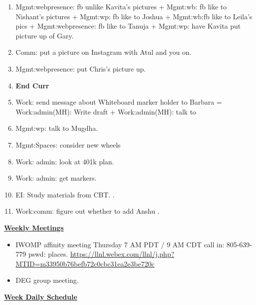 \begin{enumerate}
        \item \small Mgmt:webpresence: fb unlike Kavita’s pictures + Mgmt:wb:
          fb like to Nishant's pictures +  Mgmt:wp: fb like to Joshua
          + Mgmt:wb:fb like to Leila's pics + Mgmt:webpresence: fb
          like to Tanuja + Mgmt:wp: have Kavita put picture up of
          Gary. 

        \item \small Comm: put a picture on Instagram with Atul and you on. 
        \item \small Mgmt:webpresence: put Chris's picture up.

        \item \small \textbf{End Curr} 
        \item \small Work: send message about Whiteboard marker holder to
          Barbara = Work:admin(MH): Write draft +
          Work:admin(MH): talk to 

        \item \small Mgmt:wp: talk to Mugdha. 


        \item \small  Mgmt:Spaces: consider new wheels 
        \item \small Work: admin: look at 401k plan. 
        \item \small Work: admin: get markers.
         
        \item \small EI: Study materials from CBT.   .
        \item \small Work:comm: figure out whether to add Anshu .     
    \end{enumerate}

      
        
        \underline{\bf Weekly Meetings} 
        \begin{itemize}
          \tiny \item \tiny IWOMP affinity meeting Thursday 7 AM PDT / 9 AM
          CDT call in: 805-639-779 pswd: places. \url{https://llnl.webex.com/llnl/j.php?MTID=m33950b76befb72c0cbc31ea2e3be720c}
        \item \tiny DEG group meeting.  
        \end{itemize}

\ifdefined\POSTER %
      \underline{\bf Week Daily Schedule}
        
